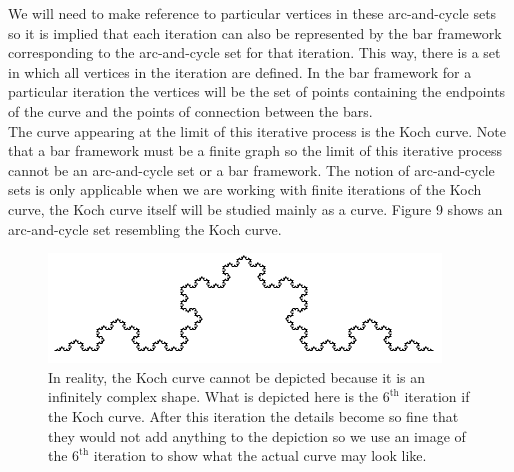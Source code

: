 \documentclass{article}
\theoremstyle{definition}
\begin{document}
\noindent We will need to make reference to particular vertices in these arc-and-cycle sets so it is implied that each iteration can also be represented by the bar framework corresponding to the arc-and-cycle set for that iteration. This way, there is a set in which all vertices in the iteration are defined. In the bar framework for a particular iteration the vertices will be the set of points containing the endpoints of the curve and the points of connection between the bars.\vspace{0.5em}\\
The curve appearing at the limit of this iterative process is the Koch curve. Note that a bar framework must be a finite graph so the limit of this iterative process cannot be an arc-and-cycle set or a bar framework. The notion of arc-and-cycle sets is only applicable when we are working with finite iterations of the Koch curve, the Koch curve itself will be studied mainly as a curve. Figure 9 shows an arc-and-cycle set resembling the Koch curve.\vspace{0.5em}\\
\begin{figure}[h]
    \centering
    \includegraphics[width=\textwidth]{Koch6.png}
    \caption{In reality, the Koch curve cannot be depicted because it is an infinitely complex shape. What is depicted here is the $6^{\text{th}}$ iteration if the Koch curve. After this iteration the details become so fine that they would not add anything to the depiction so we use an image of the $6^{\text{th}}$ iteration to show what the actual curve may look like.}
\end{figure}
\end{document}
